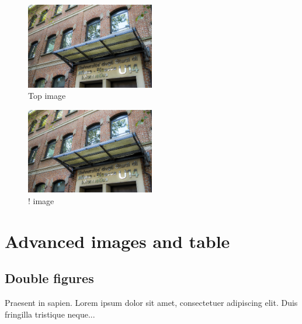 \documentclass[a4paper, oneside]{book}
\begin{document}
\begin{figure}[t]
\includegraphics[width=0.5\textwidth, inner]{u14}
\caption{Top image}
\label{fig:figure2}
\end{figure}

\begin{figure}[!]
\includegraphics[width=0.5\textwidth, inner]{u14}
\caption{! image}
\label{fig:figure3}
\end{figure}

\chapter{Advanced images and table}

\section{Double figures}
Praesent in sapien. Lorem ipsum dolor sit amet, consectetuer adipiscing elit. Duis fringilla tristique neque...
\end{document}
